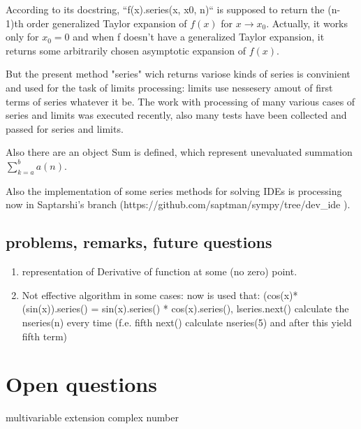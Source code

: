\documentclass[a4paper]{article}
\begin{document}
According to its docstring, ``f(x).series(x, x0, n)`` is supposed to return the (n-1)th order generalized Taylor expansion of $f(x)$ for $x \rightarrow x_0$.
Actually, it works only for $x_0 = 0$ and when f doesn't have a generalized Taylor expansion, it returns some arbitrarily chosen asymptotic expansion of $f(x)$.

But the present method "series" wich returns variose kinds of series is convinient and used for the task of limits processing: limits use nessesery amout of first terms of series whatever it be.
The work with processing of many various cases of series and limits was executed recently, also many tests have been collected and passed for series and limits.


Also there are an object Sum is defined, which represent unevaluated summation $\sum_{k=a}^b a(n) $.


Also the implementation of some series methods for solving IDEs is processing now in Saptarshi's branch (https://github.com/saptman/sympy/tree/dev_ide
).

\subsection{problems, remarks, future questions}
    \begin{enumerate}
        \item representation of Derivative of function at some (no zero) point.
        \item Not effective algorithm in some cases: now is used that: (cos(x)*(sin(x)).series() = sin(x).series() * cos(x).series(), lseries.next() calculate the nseries(n)  every time  (f.e. fifth next() calculate nseries(5) and after this yield fifth term)
    \end{enumerate}

\section{Open questions}
    \begin{enumerate}
        multivariable extension
        complex number
    \end{enumerate}
\end{document}

